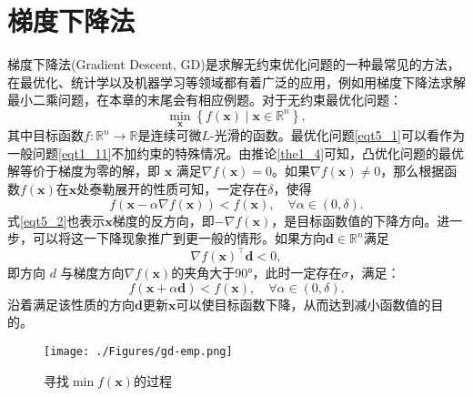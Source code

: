 \section{梯度下降法}梯度下降法(Gradient Descent, GD)是求解无约束优化问题的一种最常见的方法\cite{6302929}，在最优化、统计学以及机器学习等领域都有着广泛的应用，例如用梯度下降法求解最小二乘问题\cite{1989Least}，在本章的末尾会有相应例题。对于无约束最优化问题：
\begin{equation}
    \min _{\bm{x}}\left\{f(\bm{x}) \mid \bm{x} \in \mathbb{R}^{n}\right\} ,
    \label{eqt5_1}
\end{equation}
其中目标函数$f: \mathbb{R}^{n} \rightarrow \mathbb{R}$是连续可微$L$-光滑的函数。最优化问题\ref{eqt5_1}可以看作为一般问题\ref{eqt1_11}不加约束的特殊情况。由推论\ref{the1_4}可知，凸优化问题的最优解等价于梯度为零的解，即 $\bm{x}$ 满足$\nabla f(\bm{x})=0$。如果$\nabla f(\bm{x}) \neq 0$，那么根据函数$f(\bm{x})$在$\bm{x}$处泰勒展开的性质可知，一定存在$\delta$，使得
\begin{equation}
    f(\bm{x}-\alpha \nabla f(\bm{x}))<f(\bm{x}), \quad \forall \alpha \in(0, \delta) .
    \label{eqt5_2}
\end{equation}
式\ref{eqt5_2}也表示$\bm{x}$梯度的反方向，即$-\nabla f(\bm{x})$，是目标函数值的下降方向。进一步，可以将这一下降现象推广到更一般的情形。如果方向$\bm{d} \in \mathbb{R}^{n}$满足
\begin{equation}
    \nabla f(\bm{x})^{\top} \bm{d}<0 ,
    \nonumber
\end{equation}
即方向 $d$ 与梯度方向$\nabla f(\bm{x})$的夹角大于90°，此时一定存在$\sigma$，满足：
\begin{equation}
    f(\bm{x}+\alpha \bm{d})<f(\bm{x}), \quad \forall \alpha \in(0, \delta) .
    \label{eqt5_3}
\end{equation}
沿着满足该性质的方向$\bm{d}$更新$\bm{x}$可以使目标函数下降，从而达到减小函数值的目的。
\begin{figure}[hbtp]
    \centering
    \texttt{[image: ./Figures/gd-emp.png]}
    \caption{寻找$\min f(\bm{x})$的过程}
    \label{figure_gd_emp}
\end{figure}

